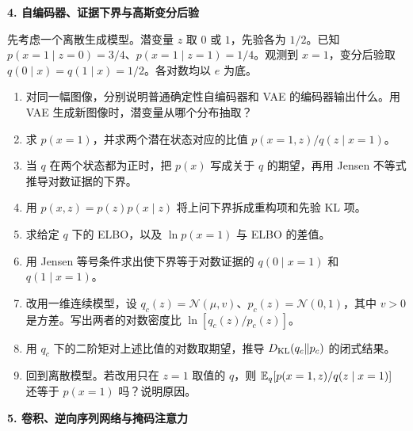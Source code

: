\noindent\textbf{4. 自编码器、证据下界与高斯变分后验}

先考虑一个离散生成模型。潜变量 $z$ 取 $0$ 或 $1$，先验各为 $1/2$。已知 $p(x=1\mid z=0)=3/4$、$p(x=1\mid z=1)=1/4$。观测到 $x=1$，变分后验取 $q(0\mid x)=q(1\mid x)=1/2$。各对数均以 $e$ 为底。

\begin{enumerate}[label=(\arabic*)]
\item 对同一幅图像，分别说明普通确定性自编码器和 VAE 的编码器输出什么。用 VAE 生成新图像时，潜变量从哪个分布抽取？
\item 求 $p(x=1)$，并求两个潜在状态对应的比值 $p(x=1,z)/q(z\mid x=1)$。
\item 当 $q$ 在两个状态都为正时，把 $p(x)$ 写成关于 $q$ 的期望，再用 Jensen 不等式推导对数证据的下界。
\item 用 $p(x,z)=p(z)p(x\mid z)$ 将上问下界拆成重构项和先验 KL 项。
\item 求给定 $q$ 下的 ELBO，以及 $\ln p(x=1)$ 与 ELBO 的差值。
\item 用 Jensen 等号条件求出使下界等于对数证据的 $q(0\mid x=1)$ 和 $q(1\mid x=1)$。
\item 改用一维连续模型，设 $q_c(z)=\mathcal N(\mu,v)$、$p_c(z)=\mathcal N(0,1)$，其中 $v>0$ 是方差。写出两者的对数密度比 $\ln[q_c(z)/p_c(z)]$。
\item 用 $q_c$ 下的二阶矩对上述比值的对数取期望，推导 $D_{\mathrm{KL}}(q_c\Vert p_c)$ 的闭式结果。
\item 回到离散模型。若改用只在 $z=1$ 取值的 $q$，则 $\mathbb{E}_q[p(x=1,z)/q(z\mid x=1)]$ 还等于 $p(x=1)$ 吗？说明原因。
\end{enumerate}

\noindent\textbf{5. 卷积、逆向序列网络与掩码注意力}


